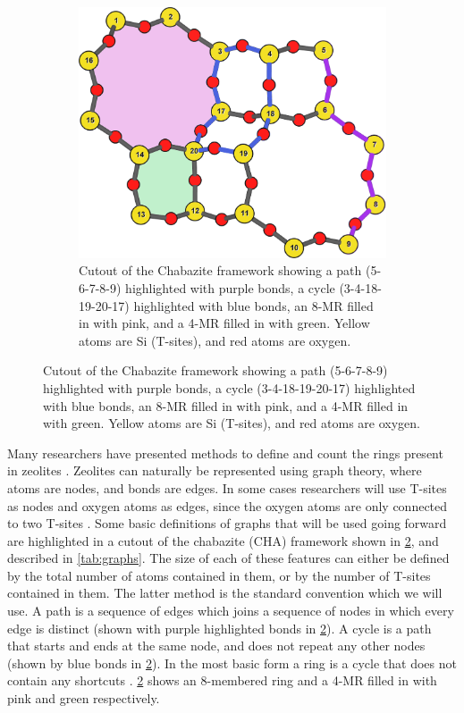 \documentclass[11pt]{article}
\begin{document}
\begin{figure}
\begin{figure}[H]
\centering
\includegraphics[width=\textwidth]{figures/chapter-3/ring-examples2.pdf}
\caption{Cutout of the Chabazite framework showing a path (5-6-7-8-9) highlighted with purple bonds, a cycle (3-4-18-19-20-17) highlighted with blue bonds, an 8-MR filled in with pink, and a 4-MR filled in with green. Yellow atoms are Si (T-sites), and red atoms are oxygen. \label{fig:3.1}}
\end{figure}
\end{figure}

Many researchers have presented methods to define and count the rings present in zeolites \cite{guttman-ring-1990,goetzke-properties-1991,franzblau-computation-1991,yuan-efficient-2002-1,wooten-structure-2002,le-roux-ring-2010,sastre-zeotsites-2001}. Zeolites can naturally be represented using graph theory, where atoms are nodes, and bonds are edges. In some cases researchers will use T-sites as nodes and oxygen atoms as edges, since the oxygen atoms are only connected to two T-sites \cite{goetzke-properties-1991}. Some basic definitions of graphs that will be used going forward are highlighted in a cutout of the chabazite (CHA) framework shown in \cref{fig:3.1}, and described in \cref{tab:graphs}. The size of each of these features can either be defined by the total number of atoms contained in them, or by the number of T-sites contained in them. The latter method is the standard convention which we will use. A path is a sequence of edges which joins a sequence of nodes in which every edge is distinct (shown with purple highlighted bonds in \cref{fig:3.1}). A cycle is a path that starts and ends at the same node, and does not repeat any other nodes (shown by blue bonds in \cref{fig:3.1}). In the most basic form a ring is a cycle that does not contain any shortcuts \cite{guttman-ring-1990,goetzke-properties-1991}. \cref{fig:3.1} shows an 8-membered ring and a 4-MR filled in with pink and green respectively.  
\end{document}
